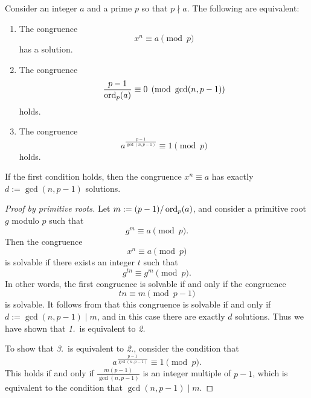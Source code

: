 \begin{theorem}
  Consider an integer $a$ and a prime $p$ so that $p\nmid a$. The following are equivalent:
  \begin{enumerate}
  \item The congruence
    \begin{equation*}
      x^n\equiv a\pmod{p}
    \end{equation*}
    has a solution.
  \item The congruence
    \begin{equation*}
      \frac{p-1}{\operatorname{ord}_p(a)}\equiv 0\mkern5mu\left(\operatorname{mod} \mkern 6mu \gcd(n,p-1)\right)
    \end{equation*}
    holds.
  \item The congruence
    \begin{equation*}
      a^{\frac{p-1}{\gcd(n,p-1)}}\equiv 1\pmod{p}
    \end{equation*}
    holds.
  \end{enumerate}
  If the first condition holds, then the congruence $x^n\equiv a$ has exactly $d:=\gcd(n,p-1)$ solutions.
\end{theorem}

\begin{proof}[Proof by primitive roots]
  Let $m:=(p-1)/\operatorname{ord}_p(a)$, and consider a primitive root $g$ modulo $p$ such that
  \begin{equation*}
    g^{m}\equiv a\pmod{p}.
  \end{equation*}
  Then the congruence
  \begin{equation*}
    x^n\equiv a\pmod{p}
  \end{equation*}
  is solvable if there exists an integer $t$ such that
  \begin{equation*}
    g^{tn}\equiv g^m\pmod{p}.
  \end{equation*}
  In other words, the first congruence is solvable if and only if the congruence
  \begin{equation*}
    tn \equiv m\pmod{p-1}
  \end{equation*}
  is solvable. It follows from  that this congruence is solvable if and only if $d:=\gcd(n,p-1)\mid m$, and in this case there are exactly $d$ solutions. Thus we have shown that {\itshape 1.}~is equivalent to {\itshape 2.}

  To show that {\itshape 3.}~is equivalent to {\itshape 2.}, consider the condition that
  \begin{equation*}
    a^{\frac{p-1}{\gcd(n,p-1)}}\equiv 1\pmod{p}.
  \end{equation*}
  This holds if and only if $\frac{m(p-1)}{\gcd(n,p-1)}$ is an integer multiple of $p-1$, which is equivalent to the condition that $\gcd(n,p-1)\mid m$.
\end{proof}

